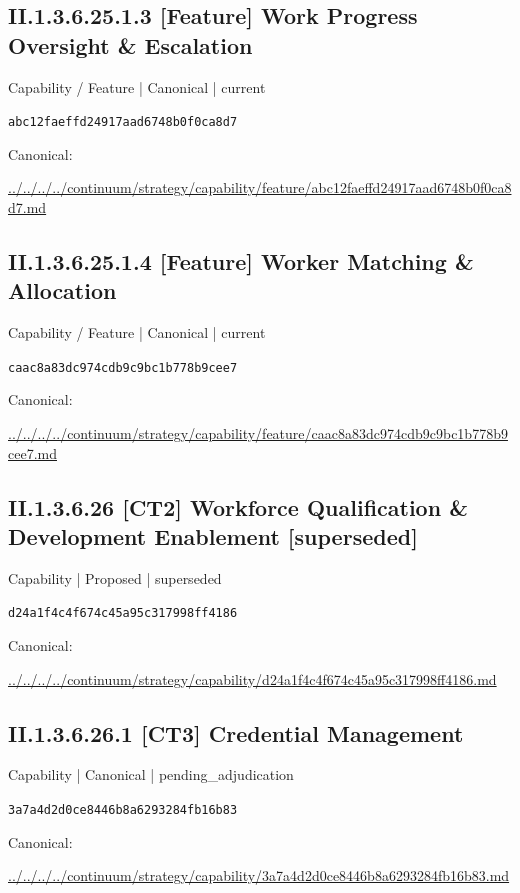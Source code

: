 \documentclass[10pt,a4paper]{article}
\begin{document}
\subsection*{II.1.3.6.25.1.3 [Feature] Work Progress Oversight \& Escalation}
\label{element-abc12faeffd24917aad6748b0f0ca8d7}
{\small Capability / Feature | Canonical | current}\par
\texttt{abc12faeffd24917aad6748b0f0ca8d7}\par
Canonical: \par
{\footnotesize\url{../../../../continuum/strategy/capability/feature/abc12faeffd24917aad6748b0f0ca8d7.md}}\par
\subsection*{II.1.3.6.25.1.4 [Feature] Worker Matching \& Allocation}
\label{element-caac8a83dc974cdb9c9bc1b778b9cee7}
{\small Capability / Feature | Canonical | current}\par
\texttt{caac8a83dc974cdb9c9bc1b778b9cee7}\par
Canonical: \par
{\footnotesize\url{../../../../continuum/strategy/capability/feature/caac8a83dc974cdb9c9bc1b778b9cee7.md}}\par
\subsection*{II.1.3.6.26 [CT2] Workforce Qualification \& Development Enablement [superseded]}
\label{element-d24a1f4c4f674c45a95c317998ff4186}
{\small Capability | Proposed | superseded}\par
\texttt{d24a1f4c4f674c45a95c317998ff4186}\par
Canonical: \par
{\footnotesize\url{../../../../continuum/strategy/capability/d24a1f4c4f674c45a95c317998ff4186.md}}\par
\subsection*{II.1.3.6.26.1 [CT3] Credential Management}
\label{element-3a7a4d2d0ce8446b8a6293284fb16b83}
{\small Capability | Canonical | pending\_adjudication}\par
\texttt{3a7a4d2d0ce8446b8a6293284fb16b83}\par
Canonical: \par
{\footnotesize\url{../../../../continuum/strategy/capability/3a7a4d2d0ce8446b8a6293284fb16b83.md}}\par
\end{document}
